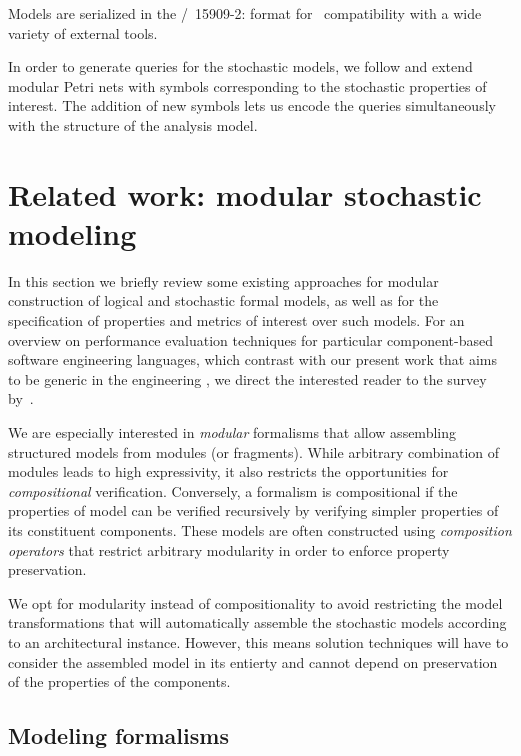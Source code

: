 Models are serialized in the /~15909-2:\citeyear{ISO1590922011}  format for ~compatibility with a wide variety of external tools.

In order to  generate queries for the stochastic models, we follow \citet{Kindler01modular} and extend modular Petri nets with symbols corresponding to the stochastic properties of interest. The addition of new symbols lets us encode the queries simultaneously with the structure of the analysis model.

\section{Related work: modular stochastic modeling}
\label{sec:rgspn:relwork}

In this section we briefly review some existing approaches for modular construction of logical and stochastic formal models, as well as for the specification of properties and metrics of interest over such models. For an overview on performance evaluation techniques for particular component-based software engineering languages, which contrast with our present work that aims to be generic in the engineering , we direct the interested reader to the survey by~\citet{Koziolek10review}. 

We are especially interested in \emph{modular} formalisms that allow assembling structured models from modules (or fragments). While arbitrary combination of modules leads to high expressivity, it also restricts the opportunities for \emph{compositional} verification. Conversely, a formalism is compositional if the properties of model can be verified recursively by verifying simpler properties of its constituent components. These models are often constructed using \emph{composition operators} that restrict arbitrary modularity in order to enforce property preservation.

We opt for modularity instead of compositionality to avoid restricting the model transformations that will automatically assemble the stochastic models according to an architectural  instance. However, this means solution techniques will have to consider the assembled model in its entierty and cannot depend on preservation of the properties of the components.

\subsection{Modeling formalisms}

